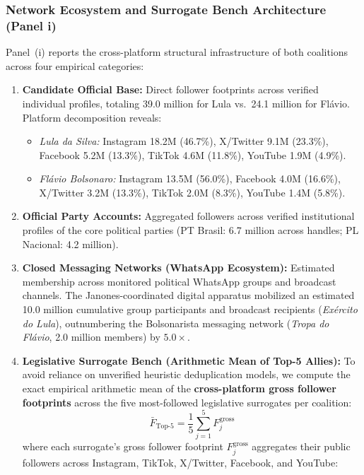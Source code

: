 \subsubsection*{Network Ecosystem and Surrogate Bench Architecture (Panel i)}
Panel~(i) reports the cross-platform structural infrastructure of both coalitions across four empirical categories:
\begin{enumerate}
    \item \textbf{Candidate Official Base:} Direct follower footprints across verified individual profiles, totaling 39.0 million for Lula vs.\ 24.1 million for Fl{\'a}vio. Platform decomposition reveals:
    \begin{itemize}
        \item \emph{Lula da Silva:} Instagram 18.2M (46.7\%), X/Twitter 9.1M (23.3\%), Facebook 5.2M (13.3\%), TikTok 4.6M (11.8\%), YouTube 1.9M (4.9\%).
        \item \emph{Fl{\'a}vio Bolsonaro:} Instagram 13.5M (56.0\%), Facebook 4.0M (16.6\%), X/Twitter 3.2M (13.3\%), TikTok 2.0M (8.3\%), YouTube 1.4M (5.8\%).
    \end{itemize}
    \item \textbf{Official Party Accounts:} Aggregated followers across verified institutional profiles of the core political parties (PT Brasil: 6.7 million across handles; PL Nacional: 4.2 million).
    \item \textbf{Closed Messaging Networks (WhatsApp Ecosystem):} Estimated membership across monitored political WhatsApp groups and broadcast channels. The Janones-coordinated digital apparatus mobilized an estimated 10.0 million cumulative group participants and broadcast recipients (\emph{Ex{\'e}rcito do Lula}), outnumbering the Bolsonarista messaging network (\emph{Tropa do Fl{\'a}vio}, 2.0 million members) by $5.0\times$.
    \item \textbf{Legislative Surrogate Bench (Arithmetic Mean of Top-5 Allies):} To avoid reliance on unverified heuristic deduplication models, we compute the exact empirical arithmetic mean of the \textbf{cross-platform gross follower footprints} across the five most-followed legislative surrogates per coalition:
    \begin{equation}
    \bar{F}_{\text{Top-5}} = \frac{1}{5} \sum_{j=1}^5 F_j^{\text{gross}}
    \end{equation}
    where each surrogate's gross follower footprint $F_j^{\text{gross}}$ aggregates their public followers across Instagram, TikTok, X/Twitter, Facebook, and YouTube:

\end{enumerate}
